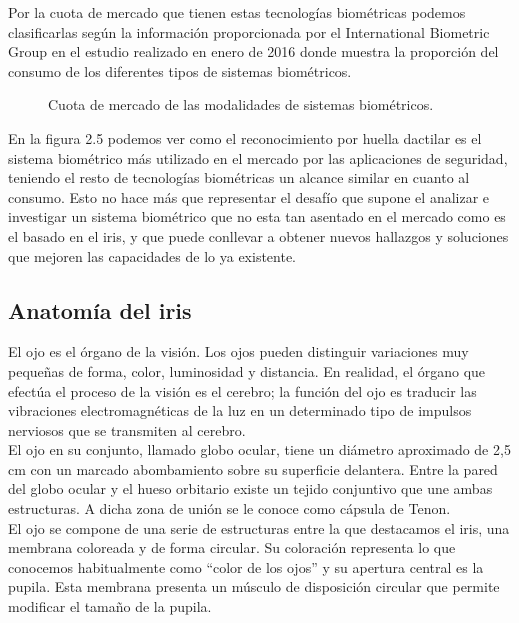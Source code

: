 Por la cuota de mercado que tienen estas tecnologías biométricas podemos clasificarlas según la información proporcionada por el International Biometric Group en el estudio realizado en enero de 2016 donde muestra la proporción del consumo de los diferentes tipos de sistemas biométricos.\\

\begin{figure}[htbp]
\centering
{}
\caption{Cuota de mercado de las modalidades de sistemas biométricos.} \label{fig:señales}
\end{figure}

En la figura 2.5 podemos ver como el reconocimiento por huella dactilar es el sistema biométrico más utilizado en el mercado por las aplicaciones de seguridad, teniendo el resto de tecnologías biométricas un alcance similar en cuanto al consumo. Esto no hace más que representar el desafío que supone el analizar e investigar un sistema biométrico que no esta tan asentado en el mercado como es el basado en el iris, y que puede conllevar a obtener nuevos hallazgos y soluciones que mejoren las capacidades de lo ya existente.


\subsection{Anatomía del iris}

El ojo es el órgano de la visión. Los ojos pueden distinguir variaciones muy pequeñas de forma, color, luminosidad y distancia. En realidad, el órgano que efectúa el proceso de la visión es el cerebro; la función del ojo es traducir las vibraciones electromagnéticas de la luz en un determinado tipo de impulsos nerviosos que se transmiten al cerebro. \\

El ojo en su conjunto, llamado globo ocular, tiene un diámetro aproximado de 2,5 cm con un marcado abombamiento sobre su superficie delantera. Entre la pared del globo ocular y el hueso orbitario existe un tejido conjuntivo que une ambas estructuras. A dicha zona de unión se le conoce como cápsula de Tenon. \\

El ojo se compone de una serie de estructuras entre la que destacamos el iris, una membrana coloreada y de forma circular. Su coloración representa lo que conocemos habitualmente como “color de los ojos” y su apertura central es la pupila. Esta membrana presenta un músculo de disposición circular que permite modificar el tamaño de la pupila.\\

